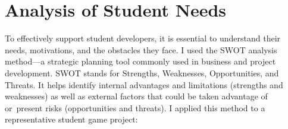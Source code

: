 \section{Analysis of Student Needs}\label{sec:swot}
To effectively support student developers, it is essential to understand their needs, motivations, and the obstacles they face. I used the SWOT analysis method—a strategic planning tool commonly used in business and project development. SWOT stands for Strengths, Weaknesses, Opportunities, and Threats. It helps identify internal advantages and limitations (strengths and weaknesses) as well as external factors that could be taken advantage of or~present risks (opportunities and threats)\cite{investopedia-swot}. I applied this method to a representative student game project:

